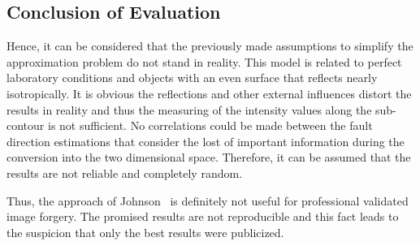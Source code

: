 \subsection{Conclusion of Evaluation}
Hence, it can be considered that the previously made assumptions to simplify the approximation problem do not stand in reality. This model is related to perfect laboratory conditions and objects with an even surface that reflects nearly isotropically. It is obvious the reflections and other external influences distort the results in reality and thus the measuring of the intensity values along the sub-contour is not sufficient. No correlations could be made between the fault direction estimations that consider the lost of important information during the conversion into the two dimensional space. Therefore, it can be assumed that the results are not reliable and completely random.

Thus, the approach of Johnson~\cite{Johnson} is definitely not useful for professional validated image forgery. The promised results are not reproducible and this fact leads to the suspicion that only the best results were publicized.

\newpage